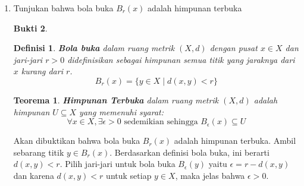 \documentclass[a4paper]{article}
\newtheorem*{teorema}{Teorema}
\newtheorem*{definisi}{Definisi}
\theoremstyle{definition}
\newtheorem*{bukti}{Bukti}
\begin{document}
\begin{enumerate}
\begin{bukti}
\begin{enumerate}
\begin{itemize}
\begin{center}
                          \end{center}
                          Dari ilustrasi diatas berlaku
                          \[\rho(z,w) \leq \rho(z,v) + \rho(v,w)\]
                  \end{itemize}
                  Jadi \(\rho(z,w) \leq \rho(z,v) + \rho(v,w)\) dengan kesamaan terjadi ketika titik $v$ berada diantara busur terpendek $z$ dan $w$.
          \end{enumerate}
          $\therefore$ \(\rho\) merupakan metrik pada \(X\). \(\square\)
        \end{bukti}
  \item Tunjukan bahwa bola buka $B_r(x)$ adalah himpunan terbuka
        \begin{bukti}
          \begin{definisi}
            \textbf{Bola buka} dalam ruang metrik $(X, d)$ dengan pusat $x \in X$ dan jari-jari $r > 0$ didefinisikan sebagai himpunan semua titik yang jaraknya dari $x$ kurang dari $r$.
            $$B_r(x) = \{ y \in X \mid d(x, y) < r \}$$
          \end{definisi}
          \begin{teorema}
            \textbf{Himpunan Terbuka} dalam ruang metrik $(X, d)$ adalah himpunan $U \subseteq X$ yang memenuhi syarat:
            $$\forall x \in X, \exists \epsilon > 0 \text{ sedemikian sehingga } B_\epsilon(x) \subseteq U$$
          \end{teorema}
          Akan dibuktikan bahwa bola buka $B_r(x)$ adalah himpunan terbuka. Ambil sebarang titik $y \in B_r(x)$. Berdasarkan definisi bola buka, ini berarti $d(x, y) < r$. Pilih jari-jari untuk bola buka $B_\epsilon(y)$ yaitu $\epsilon = r - d(x, y)$ dan karena $d(x,y) < r$ untuk setiap $y\in X$, maka jelas bahwa $\epsilon > 0$.


\end{bukti}
\end{enumerate}
\end{document}
